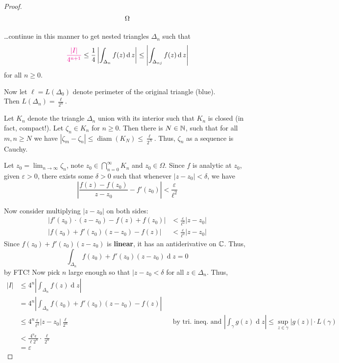\documentclass[12pt]{article}
\renewcommand{\d}{\ensuremath{\operatorname{d}}}
\begin{document}
\begin{proof}
\[\begin{tikzpicture}[x=0.75pt,y=0.75pt,yscale=-1,xscale=1]
        \draw (74,97.4) node [anchor=north west][inner sep=0.75pt]    {$\Omega $};
        
        
        \end{tikzpicture}        
        \]

    \dots continue in this manner to get nested triangles $\Delta_n$ such that \[\rt{\frac{|I|}{4^{n+1}}}\leq \frac{1}{4}\left|\int_{\Delta_n}f(z)\d z\right|\leq \left|\int_{\Delta_{nj}}f(z)\d z\right|\] for all $n\geq 0$.

    Now let $\ell=L(\Delta_0)$ denote perimeter of the original triangle (blue).\\ Then $L(\Delta_n)=\frac{\ell}{2^n}$. 

    Let $K_n$ denote the triangle $\Delta_n$ union with its interior such that $K_n$ is closed (in fact, compact!). Let $\zeta_n\in K_n$ for $n\geq 0$. Then there is $N\in \mathbb{N}$, such that for all $m,n\geq N$ we have $|\zeta_m-\zeta_n|\leq \operatorname{diam}(K_N)\leq \frac{\ell}{2^N}$. Thus, $\zeta_n$ as a sequence is Cauchy.

    Let $z_0=\lim_{n\to\infty}\zeta_n$, note $z_0\in \bigcap_{n=0}^{\infty} K_n$ and $z_0\in \Omega$. Since $f$ is analytic at $z_0$, given $\varepsilon>0$, there exists some $\delta>0$ such that whenever $|z-z_0|<\delta$, we have \[\left|\frac{f(z)-f(z_0)}{z-z_0}-f'(z_0)\right|<\frac{\varepsilon}{\ell^2}\]

    Now consider multiplying $|z-z_0|$ on both sides:
    \begin{align*}
        |f'(z_0)\cdot (z-z_0) - f(z) + f(z_0)| &< \frac{\varepsilon}{\ell^2} |z-z_0|\\
        |f(z_0) + f'(z_0)(z-z_0)-f(z)| &<\frac{\varepsilon}{\ell^2} |z-z_0|
    \end{align*}
    Since $f(z_0) + f'(z_0)(z-z_0)$ is \textbf{linear}, it has an antiderivative on $\mathbb{C}$. Thus, \[\int_{\Delta_n}f(z_0) + f'(z_0)(z-z_0)\d z = 0\]
    by FTC! Now pick $n$ large enough so that $|z-z_0<\delta$ for all $z\in \Delta_n$. Thus, \begin{align*}
        |I|&\leq 4^n \left|\int_{\Delta_n}f(z)\d z\right|\\ 
        &= 4^n\left|\int_{\Delta_n}f(z_0) + f'(z_0)(z-z_0)-f(z)\right|\\
        &\leq 4^n\frac{\varepsilon}{\ell^2}|z-z_0|\frac{\ell}{2^n} &&\text{by tri. ineq. and }\left|\int_\gamma g(z)\d z\right|\leq \sup_{z\in \gamma}|g(z)|\cdot L(\gamma)\\
        &< \frac{4^n\epsilon}{\ell 2^n}\cdot \frac{\ell}{2^n}\\
        &= \varepsilon
    \end{align*}

   
\end{proof}
\end{document}
